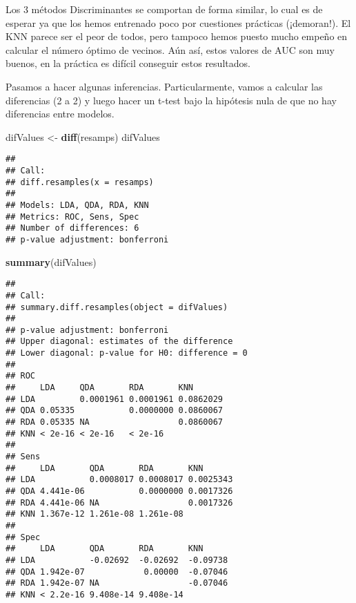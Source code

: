 \documentclass[]{book}
\newenvironment{Shaded}{\begin{snugshade}}{\end{snugshade}}
\newcommand{\KeywordTok}[1]{\textcolor[rgb]{0.13,0.29,0.53}{\textbf{#1}}}
\newcommand{\NormalTok}[1]{#1}
\newcommand{\StringTok}[1]{\textcolor[rgb]{0.31,0.60,0.02}{#1}}
\begin{document}
Los 3 métodos Discriminantes se comportan de forma similar, lo cual es de esperar ya que los hemos entrenado poco por cuestiones prácticas (¡demoran!). El KNN parece ser el peor de todos, pero tampoco hemos puesto mucho empeño en calcular el número óptimo de vecinos. Aún así, estos valores de AUC son muy buenos, en la práctica es difícil conseguir estos resultados.

Pasamos a hacer algunas inferencias. Particularmente, vamos a calcular las diferencias (2 a 2) y luego hacer un t-test bajo la hipótesis nula de que no hay diferencias entre modelos.

\begin{Shaded}
\begin{Highlighting}[]
\NormalTok{difValues <-}\StringTok{ }\KeywordTok{diff}\NormalTok{(resamps)}
\NormalTok{difValues}
\end{Highlighting}
\end{Shaded}

\begin{verbatim}
## 
## Call:
## diff.resamples(x = resamps)
## 
## Models: LDA, QDA, RDA, KNN 
## Metrics: ROC, Sens, Spec 
## Number of differences: 6 
## p-value adjustment: bonferroni
\end{verbatim}

\begin{Shaded}
\begin{Highlighting}[]
\KeywordTok{summary}\NormalTok{(difValues)}
\end{Highlighting}
\end{Shaded}

\begin{verbatim}
## 
## Call:
## summary.diff.resamples(object = difValues)
## 
## p-value adjustment: bonferroni 
## Upper diagonal: estimates of the difference
## Lower diagonal: p-value for H0: difference = 0
## 
## ROC 
##     LDA     QDA       RDA       KNN      
## LDA         0.0001961 0.0001961 0.0862029
## QDA 0.05335           0.0000000 0.0860067
## RDA 0.05335 NA                  0.0860067
## KNN < 2e-16 < 2e-16   < 2e-16            
## 
## Sens 
##     LDA       QDA       RDA       KNN      
## LDA           0.0008017 0.0008017 0.0025343
## QDA 4.441e-06           0.0000000 0.0017326
## RDA 4.441e-06 NA                  0.0017326
## KNN 1.367e-12 1.261e-08 1.261e-08          
## 
## Spec 
##     LDA       QDA       RDA       KNN     
## LDA           -0.02692  -0.02692  -0.09738
## QDA 1.942e-07            0.00000  -0.07046
## RDA 1.942e-07 NA                  -0.07046
## KNN < 2.2e-16 9.408e-14 9.408e-14
\end{verbatim}
\end{document}
